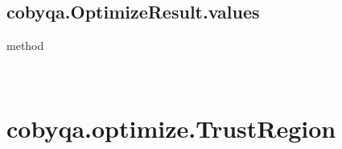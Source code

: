 \documentclass[letterpaper,10pt,english]{sphinxmanual}
\begin{document}
\begin{fulllineitems}
\begin{fulllineitems}
\end{fulllineitems}



\subsection{cobyqa.OptimizeResult.values}
\label{\detokenize{refs/generated/cobyqa.OptimizeResult.values:cobyqa-optimizeresult-values}}\label{\detokenize{refs/generated/cobyqa.OptimizeResult.values::doc}}
\sphinxAtStartPar
method

\begin{fulllineitems}
\label{\detokenize{refs/generated/cobyqa.OptimizeResult.values:cobyqa.OptimizeResult.values}}~
\end{fulllineitems}


\end{fulllineitems}



\section{cobyqa.optimize.TrustRegion}
\label{\detokenize{refs/generated/cobyqa.optimize.TrustRegion:cobyqa-optimize-trustregion}}\label{\detokenize{refs/generated/cobyqa.optimize.TrustRegion::doc}}
\end{document}
